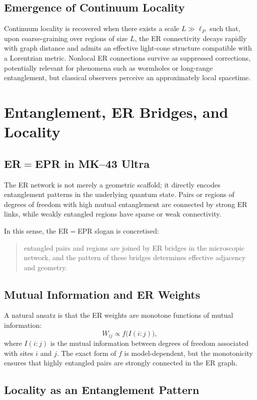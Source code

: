 \section{Emergence of Continuum Locality}

Continuum locality is recovered when there exists a scale $L\gg \ell_P$ such that, upon coarse-graining over regions of size $L$, the ER connectivity decays rapidly with graph distance and admits an effective light-cone structure compatible with a Lorentzian metric.
Nonlocal ER connections survive as suppressed corrections, potentially relevant for phenomena such as wormholes or long-range entanglement, but classical observers perceive an approximately local spacetime.

\chapter{Entanglement, ER Bridges, and Locality}

\section{ER$=$EPR in MK--43 Ultra}

The ER network is not merely a geometric scaffold; it directly encodes entanglement patterns in the underlying quantum state.
Pairs or regions of degrees of freedom with high mutual entanglement are connected by strong ER links, while weakly entangled regions have sparse or weak connectivity.

In this sense, the ER$=$EPR slogan is concretised:
\begin{quote}
  entangled pairs and regions are joined by ER bridges in the microscopic network, and the pattern of these bridges determines effective adjacency and geometry.
\end{quote}

\section{Mutual Information and ER Weights}

A natural ansatz is that the ER weights are monotone functions of mutual information:
\[
  W_{ij} \propto f\big(I(i:j)\big),
\]
where $I(i:j)$ is the mutual information between degrees of freedom associated with sites $i$ and $j$.
The exact form of $f$ is model-dependent, but the monotonicity ensures that highly entangled pairs are strongly connected in the ER graph.

\section{Locality as an Entanglement Pattern}

